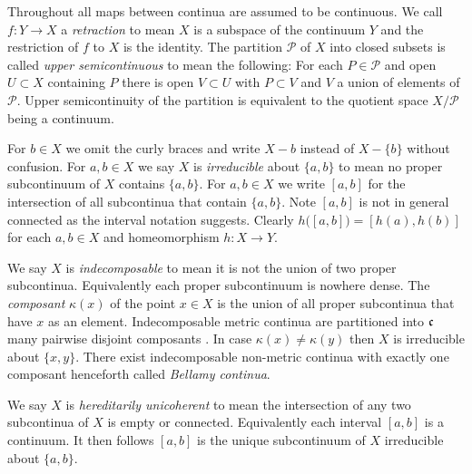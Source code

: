 \documentclass[12pt]{article}
\theoremstyle{plain}
\theoremstyle{definition}
\newcommand{\K}{\ensuremath{\kappa}}
\newcommand{\0}{\ensuremath{\varnothing}}
\newcommand{\cP}{\ensuremath{\mathcal P}}
\newcommand{\cn}{\ensuremath{\frak c}}
\begin{document}
	
	Throughout all maps between continua are assumed to be continuous.
	We call $f:Y \to X$ a \textit{retraction} to mean $X$ is a subspace of the continuum $Y$ and the restriction of $f$ to $X$ is the identity.
	The partition $\cP$ of $X$ into closed subsets is called \textit{upper semicontinuous} to mean the following:
	For each $P \in \cP$ and open $U \subset X$ containing $P$ there is open $V \subset U$ with $P \subset V$ and $V$ a union of elements of $\cP$.
	Upper semicontinuity of the partition is equivalent to the quotient space $X/\cP$ being a continuum.
	
	
	For $b \in X$ we omit the curly braces and write $X-b$ instead of $X-\{b\}$ without confusion.
	For $a,b \in X$ we say $X$ is \textit{irreducible} about $\{a,b\}$ to mean no proper subcontinuum of $X$ contains $\{a,b\}$.
	For $a,b \in X$ we write $[a,b]$ for the intersection of all subcontinua that contain $\{a,b\}$.
	Note $[a,b]$ is not in general connected as the interval notation suggests.
	Clearly $h\big ([a,b] \big ) = [h(a),h(b)]$ for each $a,b \in X$ and homeomorphism $h:X \to Y$. 
	
	We say $X$ is \textit{indecomposable} to mean it is not the union of two proper subcontinua.
	Equivalently each proper subcontinuum is nowhere dense.
	The \textit{composant} $\K(x)$ of the point $x \in X$ is the union of all proper subcontinua that have $x$ as an element.
	Indecomposable metric continua are partitioned into $\cn$ many pairwise disjoint composants \cite{Ccomposants}.
	In case $\K(x) \ne \K(y)$ then $X$ is irreducible about $\{x,y\}$.
	There exist indecomposable non-metric continua with exactly one composant \cite{one} henceforth called \textit{Bellamy continua}.
	
	We say $X$ is \textit{hereditarily unicoherent} to mean 
	the intersection of any two subcontinua of $X$ is empty or connected.
	Equivalently each interval $[a,b]$ is a continuum.
	It then follows $[a,b]$ is the unique subcontinuum of $X$ irreducible about $\{a,b\}$.
	
\end{document}

